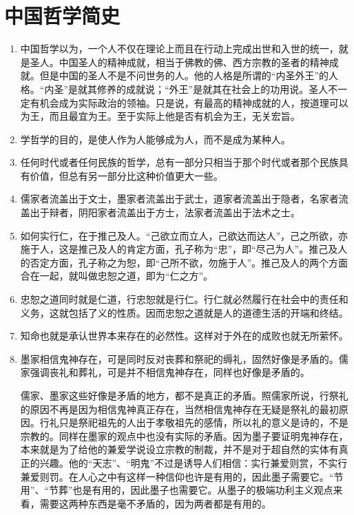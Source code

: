 \documentclass[UTF8]{ctexart}
\begin{document}
	\newpage
	
	\section{中国哲学简史}
	
		
		\begin{enumerate}
			\item 中国哲学以为，一个人不仅在理论上而且在行动上完成出世和入世的统一，就是圣人。中国圣人的精神成就，相当于佛教的佛、西方宗教的圣者的精神成就。但是中国的圣人不是不问世务的人。他的人格是所谓的“内圣外王”的人格。“内圣”是就其修养的成就说；“外王”是就其在社会上的功用说。圣人不一定有机会成为实际政治的领袖。只是说，有最高的精神成就的人，按道理可以为王，而且最宜为王。至于实际上他是否有机会为王，无关宏旨。
			
			\item 学哲学的目的，是使人作为人能够成为人，而不是成为某种人。
			
			\item 任何时代或者任何民族的哲学，总有一部分只相当于那个时代或者那个民族具有价值，但总有另一部分比这种价值更大一些。
			
			\item 儒家者流盖出于文士，墨家者流盖出于武士，道家者流盖出于隐者，名家者流盖出于辩者，阴阳家者流盖出于方士，法家者流盖出于法术之士。
			
			\item 如何实行仁，在于推己及人。“己欲立而立人，己欲达而达人”，己之所欲，亦施于人，这是推己及人的肯定方面，孔子称为“忠”，即“尽己为人”。推己及人的否定方面，孔子称之为恕，即“己所不欲，勿施于人”。推己及人的两个方面合在一起，就叫做忠恕之道，即为“仁之方”。
			
			\item 忠恕之道同时就是仁道，行忠恕就是行仁。行仁就必然履行在社会中的责任和义务，这就包括了义的性质。因而忠恕之道就是人的道德生活的开端和终结。
			
			\item 知命也就是承认世界本来存在的必然性。这样对于外在的成败也就无所萦怀。
			
			\item 墨家相信鬼神存在，可是同时反对丧葬和祭祀的缛礼，固然好像是矛盾的。儒家强调丧礼和葬礼，可是并不相信鬼神存在，同样也好像是矛盾的。
			
			儒家、墨家这些好像是矛盾的地方，都不是真正的矛盾。照儒家所说，行祭礼的原因不再是因为相信鬼神真正存在，当然相信鬼神存在无疑是祭礼的最初原因。行礼只是祭祀祖先的人出于孝敬祖先的感情，所以礼的意义是诗的，不是宗教的。同样在墨家的观点中也没有实际的矛盾。因为墨子要证明鬼神存在，本来就是为了给他的兼爱学说设立宗教的制裁，并不是对于超自然的实体有真正的兴趣。他的“天志”、“明鬼”不过是诱导人们相信：实行兼爱则赏，不实行兼爱则罚。在人心之中有这样一种信仰也许是有用的，因此墨子需要它。“节用”、“节葬”也是有用的，因此墨子也需要它。从墨子的极端功利主义观点来看，需要这两种东西是毫不矛盾的，因为两者都是有用的。
			

\end{enumerate}
\end{document}
